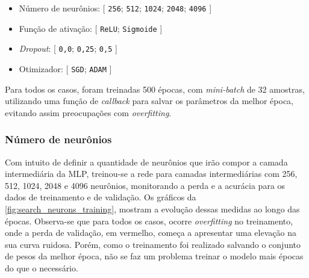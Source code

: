 \begin{itemize}
	\item Número de neurônios: [ \texttt{256}; \texttt{512}; \texttt{1024}; \texttt{2048}; \texttt{4096} ]
	\item Função de ativação: [ \texttt{ReLU}; \texttt{Sigmoide} ]
	\item \textit{Dropout}: [ \texttt{0,0}; \texttt{0,25}; \texttt{0,5} ]
	\item Otimizador: [ \texttt{SGD}; \texttt{ADAM} ]
\end{itemize} 

Para todos os casos, foram treinadas 500 épocas, com \textit{mini-batch} de 32 amostras, utilizando uma função de \textit{callback} para salvar os parâmetros da melhor época, evitando assim preocupações com \textit{overfitting}.

\subsubsection{Número de neurônios}

Com intuito de definir a quantidade de neurônios que irão compor a camada intermediária da MLP, treinou-se a rede para camadas intermediárias com 256, 512, 1024, 2048 e 4096 neurônios, monitorando a perda e a acurácia para os dados de treinamento e de validação. Os gráficos da \autoref{fig:search_neurons_training}, mostram a evolução dessas medidas ao longo das épocas. Observa-se que para todos os casos, ocorre \textit{overfitting} no treinamento, onde a perda de validação, em vermelho, começa a apresentar uma elevação na sua curva ruidosa. Porém, como o treinamento foi realizado salvando o conjunto de pesos da melhor época, não se faz um problema treinar o modelo mais épocas do que o necessário.

